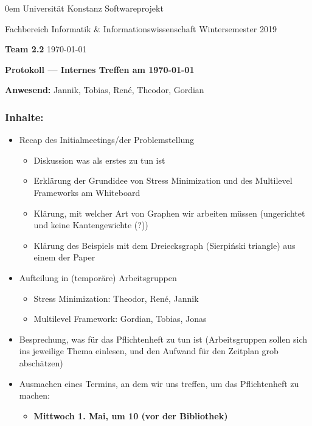 \documentclass[11pt]{article} %
\newcommand{\names}{Team 2.2}
\begin{document}
\thispagestyle{plain}
{\footnotesize \parindent0em
    {\sc Universität Konstanz} \hfill {\sc Softwareprojekt}\par
    {\sc Fachbereich Informatik \& Informationswissenschaft} \hfill Wintersemester 2019 \par
    \textbf{\names} \hfill \today\par
    \begin{center}
      {\Large\bf Protokoll --- Internes Treffen am \today}
    \end{center}}
  \par{\textbf{Anwesend:}} Jannik, Tobias, René, Theodor, Gordian
\subsubsection*{Inhalte:}
  \begin{itemize}
  \item Recap des Initialmeetings/der Problemstellung
    \begin{itemize}
    \item Diskussion was als erstes zu tun ist
    \item Erklärung der Grundidee von Stress Minimization und
      des Multilevel Frameworks am Whiteboard
    \item Klärung, mit welcher Art von Graphen wir arbeiten müssen
      (ungerichtet und keine Kantengewichte (?))
    \item Klärung des Beispiels mit dem Dreiecksgraph (Sierpiński triangle) aus einem der Paper
    \end{itemize}
  \item Aufteilung in (temporäre) Arbeitsgruppen
    \begin{itemize}
    \item Stress Minimization: Theodor, René, Jannik
    \item Multilevel Framework: Gordian, Tobias, Jonas
    \end{itemize}
  \item Besprechung, was für das Pflichtenheft zu tun ist
    (Arbeitsgruppen sollen sich ins jeweilige Thema einlesen,
    und den Aufwand für den Zeitplan grob abschätzen)
  \item Ausmachen eines Termins, an dem wir uns treffen, um
    das Pflichtenheft zu machen:
    \begin{itemize}
    \item {\large \bf Mittwoch 1. Mai, um 10 (vor der Bibliothek)}
    \end{itemize}
  \end{itemize}  
\end{document}
